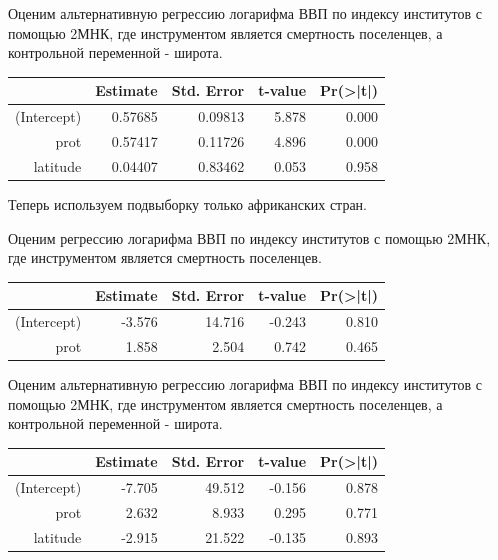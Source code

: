 \documentclass[a4paper,12pt]{article} %
\begin{document}
Оценим альтернативную регрессию логарифма ВВП по индексу институтов с помощью 2МНК, где инструментом является смертность  поселенцев, а контрольной переменной - широта.


\begin{table}[h!]
	\centering
	\begin{tabular}{rrrrr}
		\hline
		& Estimate & Std. Error & t-value & Pr(>|t|) \\ 
		\hline
		(Intercept) &  0.57685  &  0.09813 &  5.878 & 0.000    \\ 
		prot & 0.57417  &  0.11726 &  4.896 & 0.000 \\ 
		latitude &   0.04407  &  0.83462 &  0.053  &  0.958   
		\\ 
		\hline
	\end{tabular}
\end{table}	




Теперь используем подвыборку только африканских стран. 

Оценим регрессию логарифма ВВП по индексу институтов с помощью 2МНК, где инструментом является смертность  поселенцев.

\begin{table}[h!]
	\centering
	\begin{tabular}{rrrrr}
		\hline
		& Estimate & Std. Error & t-value & Pr(>|t|) \\ 
		\hline
		(Intercept) & -3.576  &  14.716 & -0.243  &  0.810  \\ 
		prot & 1.858   &   2.504 &  0.742  &  0.465 
		\\ 
		\hline
	\end{tabular}
\end{table}	



Оценим альтернативную регрессию логарифма ВВП по индексу институтов с помощью 2МНК, где инструментом является смертность  поселенцев, а контрольной переменной - широта.


\begin{table}[h!]
	\centering
	\begin{tabular}{rrrrr}
		\hline
		& Estimate & Std. Error & t-value & Pr(>|t|) \\ 
		\hline
		(Intercept) &  -7.705 &    49.512 & -0.156  &  0.878  \\ 
		prot &  2.632   &   8.933 &  0.295 &   0.771 \\ 
		latitude &  -2.915  &   21.522 & -0.135 &   0.893   
		\\ 
		\hline
	\end{tabular}
\end{table}	
\end{document}
